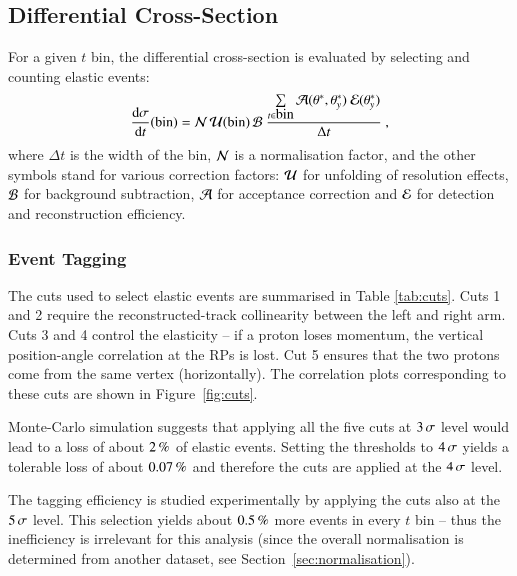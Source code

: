 
\subsection{Differential Cross-Section}
\label{sec:diff cs}

For a given $t$ bin, the differential cross-section is evaluated by selecting and counting elastic events:
\begin{equation}
	{\d\sigma\over \d t}(\hbox{bin}) =
		{\cal N}\, {\cal U}({\rm bin})\, {\cal B}\ 
		{\sum\limits_{t \in \hbox{bin}} {\cal A}(\theta^*, \theta_y^*)\ {\cal E}(\theta_y^*)\over \Delta t}\ ,
\end{equation}
where $\Delta t$ is the width of the bin, ${\cal N}$ is a normalisation factor, 
and the other symbols stand for various correction factors:
${\cal U}$ for unfolding of resolution effects, ${\cal B}$ for background subtraction, ${\cal A}$ for acceptance correction and ${\cal E}$ for detection and reconstruction efficiency.


\subsubsection{Event Tagging}
\label{sec:tagging}

The cuts used to select elastic events are summarised in Table \ref{tab:cuts}. Cuts 1 and 2 require the reconstructed-track collinearity between the left and right arm. Cuts 3 and 4 control the elasticity -- if a proton loses momentum, the vertical position-angle correlation at the RPs is lost. Cut 5 ensures that the two protons come from the same vertex (horizontally). The correlation plots corresponding to these cuts are shown in Figure~\ref{fig:cuts}.

Monte-Carlo simulation suggests that applying all the five cuts at $3\,{\rm \sigma}$ level would lead to a loss of about $2\,{\rm \%}$ of elastic events. Setting the thresholds to $4\,{\rm \sigma}$ yields a tolerable loss of about $0.07\,{\rm \%}$ and therefore the cuts are applied at the $4\,{\rm \sigma}$ level.

The tagging efficiency is studied experimentally by applying the cuts also at the $5\,{\rm \sigma}$ level. This selection yields about $0.5\,{\rm \%}$ more events in every $t$ bin -- thus the inefficiency is irrelevant for this analysis (since the overall normalisation is determined from another dataset, see Section~\ref{sec:normalisation}).


